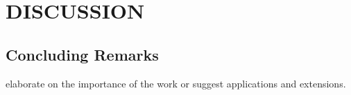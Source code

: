 \section{DISCUSSION}
\subsection{Concluding Remarks}
elaborate on the importance of the work or suggest applications and extensions. 



